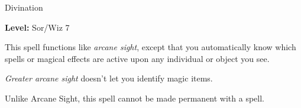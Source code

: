 
Divination

\textbf{Level:} Sor/Wiz 7

This spell functions like \textit{arcane sight}, except that you automatically 
know which spells or magical effects are active upon any individual or object you 
see.

\textit{Greater arcane sight} doesn't let you identify magic items.

Unlike Arcane Sight, this spell cannot be made permanent with a  spell.

